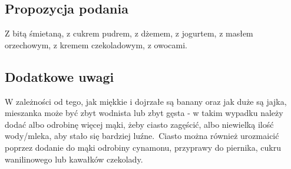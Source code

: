 \vspace{0.5cm}

\small \subsection*{Propozycja podania} Z bitą śmietaną, z cukrem pudrem, z dżemem, z jogurtem, z masłem orzechowym, z kremem czekoladowym, z owocami.

\vspace{0.3cm}

\subsection*{Dodatkowe uwagi} W zależności od tego, jak miękkie i dojrzałe są banany oraz jak duże są jajka, mieszanka może być zbyt wodnista lub zbyt gęsta - w takim wypadku należy dodać albo odrobinę więcej mąki, żeby ciasto zagęścić, albo niewielką ilość wody/mleka, aby stało się bardziej luźne.\ Ciasto można również urozmaicić poprzez dodanie do mąki odrobiny cynamonu, przyprawy do piernika, cukru wanilinowego lub kawałków czekolady.

\newpage
